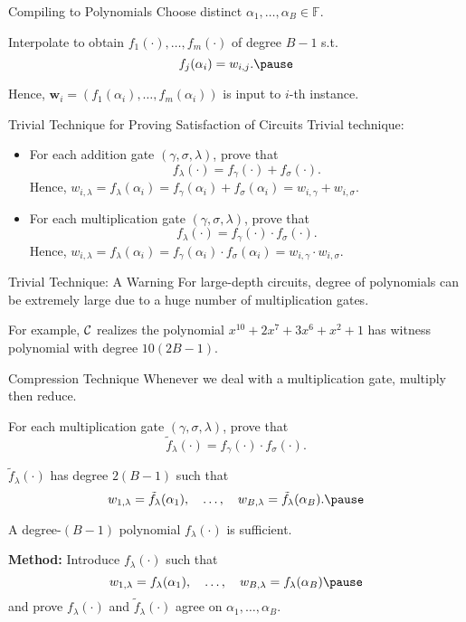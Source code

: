
\begin{frame}{Compiling to Polynomials}
	Choose distinct $\alpha_1, \dots, \alpha_B \in \mathbb{F}$.\pause
	
	Interpolate to obtain $f_1(\cdot), \dots, f_m(\cdot)$ of degree $B - 1$ s.t.\pause
	\begin{equation*}
		f_j(\alpha_i) = w_{i,j}.\pause
	\end{equation*}

	Hence, $\mathbf{w}_i = (f_1(\alpha_i), \dots, f_m(\alpha_i))$ is input to $i$-th instance. 
\end{frame}

\begin{frame}{Trivial Technique for Proving Satisfaction of Circuits}
	Trivial technique:\pause
	\begin{itemize}
		\item For each addition gate $(\gamma, \sigma, \lambda)$, prove that $$f_\lambda(\cdot) = f_\gamma(\cdot) + f_\sigma(\cdot).$$\pause
		Hence, $w_{i,\lambda} = f_\lambda(\alpha_i) = f_\gamma(\alpha_i) + f_\sigma(\alpha_i) = w_{i, \gamma} + w_{i, \sigma}$.\pause
		\item For each multiplication gate $(\gamma, \sigma, \lambda)$, prove that $$f_\lambda(\cdot) = f_\gamma(\cdot) \cdot f_\sigma(\cdot).$$\pause
		Hence, $w_{i,\lambda} = f_\lambda(\alpha_i) = f_\gamma(\alpha_i) \cdot f_\sigma(\alpha_i) = w_{i, \gamma} \cdot w_{i, \sigma}$.
	\end{itemize} 
\end{frame} 
\begin{frame}{Trivial Technique: A Warning}
	For large-depth circuits, degree of polynomials can be extremely large due to a huge number of multiplication gates.\pause
	
	For example, $\mathcal{C}$ realizes the polynomial $x^{10} + 2x^7 + 3x^6 + x^2 + 1$ has witness polynomial with degree $10(2B - 1)$.
\end{frame} 
\begin{frame}{Compression Technique}
	Whenever we deal with a multiplication gate, multiply then reduce.\pause
	
	For each multiplication gate $(\gamma, \sigma, \lambda)$, prove that $$\tilde{f}_\lambda(\cdot) = f_\gamma(\cdot) \cdot f_\sigma(\cdot).$$\pause
	
	$\tilde{f}_\lambda(\cdot)$ has degree $2(B - 1)$ such that \pause
	\begin{equation*}
	 	w_{1, \lambda} = \tilde{f}_\lambda(\alpha_1), \quad \dots, \quad w_{B, \lambda} = \tilde{f}_\lambda(\alpha_B). \pause
	\end{equation*}
	
	A degree-$(B - 1)$ polynomial $f_\lambda(\cdot)$ is sufficient.\pause
	
	\textbf{Method:} Introduce $f_\lambda(\cdot)$ such that \pause
	\begin{equation*}
		w_{1, \lambda} = f_\lambda(\alpha_1), \quad \dots, \quad w_{B, \lambda} = f_\lambda(\alpha_B)\pause
	\end{equation*}
	and prove $f_\lambda(\cdot)$ and $\tilde{f}_\lambda(\cdot)$ agree on $\alpha_1, \dots, \alpha_B$.
\end{frame}
